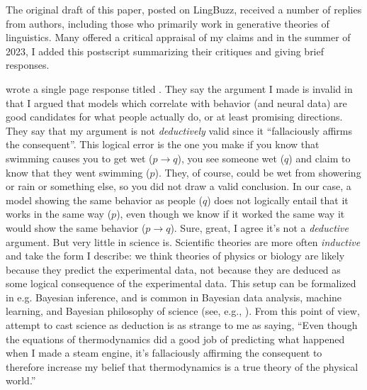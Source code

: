 \documentclass[output=paper,colorlinks,citecolor=brown]{langscibook}
\begin{document}
The original draft of this paper, posted on LingBuzz, received a number of replies from authors, including those who primarily work in generative theories of linguistics. Many offered a critical appraisal of my claims and in the summer of 2023, I added this postscript  summarizing their critiques and giving brief responses.

\citet{rawski2023modern} wrote a single page response titled . They say the argument I made is invalid in that I argued that models which correlate with behavior (and neural data) are good candidates for what people actually do, or at least promising directions. They say that my argument is not \textit{deductively} valid since it ``fallaciously affirms the consequent''. This logical error is the one you make if you know that swimming causes you to get wet ($p \to q$), you see someone wet ($q$) and claim to know that they went swimming ($p$). They, of course, could be wet from showering or rain or something else, so you did not draw a valid conclusion. In our case, a model showing the same behavior as people ($q$) does not logically entail that it works in the same way ($p$), even though we know if it worked the same way it would show the same behavior ($p \to q$). Sure, great, I agree it's not a \textit{deductive} argument. But very little in science is. Scientific theories are more often \textit{inductive} and take the form I describe: we think theories of physics or biology are likely because they predict the experimental data, not because they are deduced as some logical consequence of the experimental data. This setup can be formalized in e.g. Bayesian inference, and is common in Bayesian data analysis, machine learning, and Bayesian philosophy of science (see, e.g., \citealt{jeffreys1998theory,godfrey2009theory}). From this point of view,  attempt to cast science as deduction is as strange to me as saying, ``Even though the equations of thermodynamics did a good job of predicting what happened when I made a steam engine, it's fallaciously affirming the consequent to therefore increase my belief that thermodynamics is a true theory of the physical world.'' 
\end{document}
